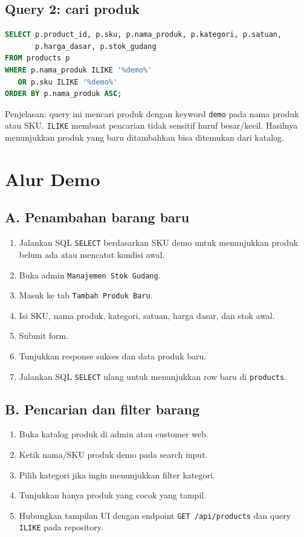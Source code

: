 \documentclass[11pt,a4paper]{article}
\begin{document}
\subsection*{Query 2: cari produk}
\begin{lstlisting}[language=SQL]
SELECT p.product_id, p.sku, p.nama_produk, p.kategori, p.satuan,
       p.harga_dasar, p.stok_gudang
FROM products p
WHERE p.nama_produk ILIKE '%demo%'
   OR p.sku ILIKE '%demo%'
ORDER BY p.nama_produk ASC;
\end{lstlisting}

Penjelasan: query ini mencari produk dengan keyword \texttt{demo} pada nama produk atau SKU. \texttt{ILIKE} membuat pencarian tidak sensitif huruf besar/kecil. Hasilnya menunjukkan produk yang baru ditambahkan bisa ditemukan dari katalog.

\section*{Alur Demo}
\subsection*{A. Penambahan barang baru}
\begin{enumerate}
\item Jalankan SQL \texttt{SELECT} berdasarkan SKU demo untuk menunjukkan produk belum ada atau mencatat kondisi awal.
\item Buka admin \texttt{Manajemen Stok Gudang}.
\item Masuk ke tab \texttt{Tambah Produk Baru}.
\item Isi SKU, nama produk, kategori, satuan, harga dasar, dan stok awal.
\item Submit form.
\item Tunjukkan response sukses dan data produk baru.
\item Jalankan SQL \texttt{SELECT} ulang untuk menunjukkan row baru di \texttt{products}.
\end{enumerate}

\subsection*{B. Pencarian dan filter barang}
\begin{enumerate}
\item Buka katalog produk di admin atau customer web.
\item Ketik nama/SKU produk demo pada search input.
\item Pilih kategori jika ingin menunjukkan filter kategori.
\item Tunjukkan hanya produk yang cocok yang tampil.
\item Hubungkan tampilan UI dengan endpoint \texttt{GET /api/products} dan query \texttt{ILIKE} pada repository.
\end{enumerate}
\end{document}
